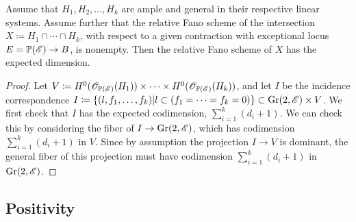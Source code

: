 \begin{proposition}
	\label{prop:ExpectedDimCI}
	Assume that $H_1,H_2,\dots,H_k$ are ample and general in their respective linear systems. Assume further that the relative Fano scheme of the intersection $X \coloneqq H_1 \cap \cdots \cap H_k$, with respect to a given contraction with exceptional locus $E = \mathbb{P}(\mathscr{E}) \to B$, is nonempty. Then the relative Fano scheme of $X$ has the expected dimension.
\end{proposition}
\begin{proof}
	Let $V \coloneqq H^0(\mathscr{O}_{\mathbb{P}(\mathscr{E})}(H_1)) \times \cdots \times H^0(\mathscr{O}_{\mathbb{P}(\mathscr{E})}(H_k))$, and let $I$ be the incidence correspondence $I \coloneqq \lbrace (l,f_1,\dots,f_k) \vert l \subset (f_1 = \cdots = f_k = 0)\rbrace \subset \operatorname{Gr}(2,\mathscr{E}) \times V$. We first check that $I$ has the expected codimension, $\sum_{i=1}^k(d_i+1)$. We can check this by considering the fiber of $I \to \operatorname{Gr}(2,\mathscr{E})$, which has codimension $\sum_{i=1}^k(d_i+1)$ in $V$. Since by assumption the projection $I \to V$ is dominant, the general fiber of this projection must have codimension $\sum_{i=1}^k(d_i+1)$ in $\operatorname{Gr}(2,\mathscr{E})$.
\end{proof}

\subsection{Positivity}

